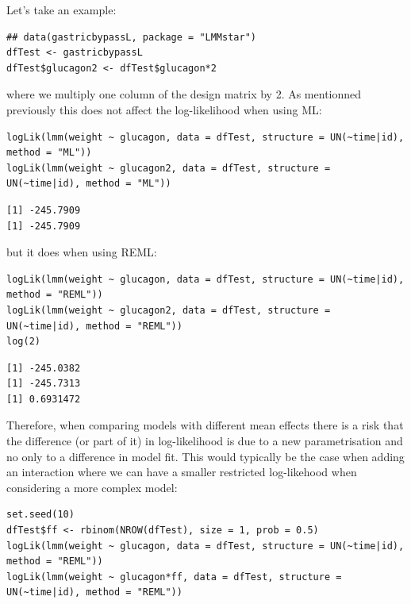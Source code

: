 \documentclass[12pt]{article}
\begin{document}
\bigskip

Let's take an example:
\lstset{language=r,label= ,caption= ,captionpos=b,numbers=none}
\begin{lstlisting}
## data(gastricbypassL, package = "LMMstar")
dfTest <- gastricbypassL
dfTest$glucagon2 <- dfTest$glucagon*2
\end{lstlisting}

where we multiply one column of the design matrix by 2. As mentionned
previously this does not affect the log-likelihood when using ML:
\lstset{language=r,label= ,caption= ,captionpos=b,numbers=none}
\begin{lstlisting}
logLik(lmm(weight ~ glucagon, data = dfTest, structure = UN(~time|id), method = "ML"))
logLik(lmm(weight ~ glucagon2, data = dfTest, structure = UN(~time|id), method = "ML"))
\end{lstlisting}

\begin{verbatim}
[1] -245.7909
[1] -245.7909
\end{verbatim}


but it does when using REML:
\lstset{language=r,label= ,caption= ,captionpos=b,numbers=none}
\begin{lstlisting}
logLik(lmm(weight ~ glucagon, data = dfTest, structure = UN(~time|id), method = "REML"))
logLik(lmm(weight ~ glucagon2, data = dfTest, structure = UN(~time|id), method = "REML"))
log(2)
\end{lstlisting}

\begin{verbatim}
[1] -245.0382
[1] -245.7313
[1] 0.6931472
\end{verbatim}


Therefore, when comparing models with different mean effects there is
a risk that the difference (or part of it) in log-likelihood is due to
a new parametrisation and no only to a difference in model fit. This
would typically be the case when adding an interaction where we can
have a smaller restricted log-likehood when considering a more complex
model:

\lstset{language=r,label= ,caption= ,captionpos=b,numbers=none}
\begin{lstlisting}
set.seed(10)
dfTest$ff <- rbinom(NROW(dfTest), size = 1, prob = 0.5)
logLik(lmm(weight ~ glucagon, data = dfTest, structure = UN(~time|id), method = "REML"))
logLik(lmm(weight ~ glucagon*ff, data = dfTest, structure = UN(~time|id), method = "REML"))
\end{lstlisting}
\end{document}
